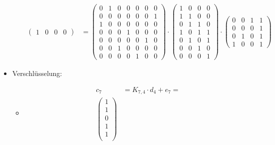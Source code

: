 \begin{itemize}
\begin{itemize}
\begin{align*}
\begin{pmatrix}
                1 & 0 & 0 & 0
            \end{pmatrix}
            &=
            \begin{pmatrix} %
                0 & 1 & 0 & 0 & 0 & 0 & 0\\
                0 & 0 & 0 & 0 & 0 & 0 & 1\\
                1 & 0 & 0 & 0 & 0 & 0 & 0\\
                0 & 0 & 0 & 1 & 0 & 0 & 0\\
                0 & 0 & 0 & 0 & 0 & 1 & 0\\
                0 & 0 & 1 & 0 & 0 & 0 & 0\\
                0 & 0 & 0 & 0 & 1 & 0 & 0
            \end{pmatrix}
            \cdot
            \begin{pmatrix} %
                1 & 0 & 0 & 0\\
                1 & 1 & 0 & 0\\
                0 & 1 & 1 & 0\\
                1 & 0 & 1 & 1\\
                0 & 1 & 0 & 1\\
                0 & 0 & 1 & 0\\
                0 & 0 & 0 & 1
            \end{pmatrix}
            \cdot
            \begin{pmatrix} %
                0 & 0 & 1 & 1\\
                0 & 0 & 0 & 1\\
                0 & 1 & 0 & 1\\
                1 & 0 & 0 & 1
            \end{pmatrix}
        \end{align*}
    \end{itemize}
    \item Verschlüsselung:
    \begin{itemize}
        \item[]
        \begin{align*}
            c_7&=K_{7,4}\cdot d_4 + e_7=\\
        \begin{pmatrix} %
            1\\
            1\\
            0\\
            1\\
            1\\

\end{pmatrix}
\end{align*}
\end{itemize}
\end{itemize}
